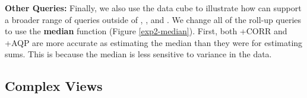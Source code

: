 
\textbf{Other Queries: } %
Finally, we also use the data cube to illustrate how \svc can support a broader range of queries outside of \sumfunc, \countfunc, and \avgfunc.
We change all of the roll-up queries to use the \textbf{median} function (Figure \ref{exp2-median}).
First, both \svcnospace+CORR and \svcnospace+AQP are more accurate as estimating the median than they were for estimating sums. 
This is because the median is less sensitive to variance in the data.
\fi

\subsection{Complex Views}\label{complexviews}

